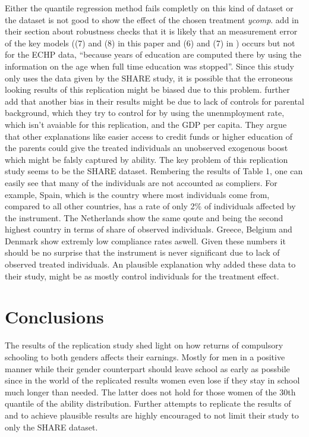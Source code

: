 \documentclass[12pt,a4paper]{article}
\begin{document}
Either the quantile regression method fails completly on this kind of
dataset or the dataset is not good to show the effect of the chosen
treatment \textit{ycomp}. \textcite{brunello} add in their section about
robustness checks that it is likely that an measurement error of the key
models ((7) and (8) in this paper and (6) and (7) in
\textcite{brunello}) occurs but not for the ECHP data, \enquote{because
years of education are computed there by using the information on the
age when full time education was stopped}. Since this study only uses
the data given by the SHARE study, it is possible that the erroneous
looking results of this replication might be biased due to this problem.
\textcite{brunello} further add that another bias in their results might
be due to lack of controls for parental background, which they try to
control for by using the unenmployment rate, which isn't avaiable for
this replication, and the GDP per capita. They argue that other
explanations like easier access to credit funds or higher education of
the parents could give the treated individuals an unobserved exogenous
boost which might be falsly captured by ability. The key problem of this
replication study seems to be the SHARE dataset. Rembering the results
of Table 1, one can easily see that many of the individuals are not
accounted as compliers. For example, Spain, which is the country where
most individuals come from, compared to all other countries, has a rate
of only 2\% of individuals affected by the instrument. The Netherlands
show the same qoute and being the second highest country in terms of
share of observed individuals. Greece, Belgium and Denmark show extremly
low compliance rates aswell. Given these numbers it should be no
surprise that the instrument is never significant due to lack of
observed treated individuals. An plausible explanation why
\textcite{brunello} added these data to their study, might be as mostly
control individuals for the treatment effect.

\hypertarget{conclusions}{%
\section{Conclusions}\label{conclusions}}

The results of the replication study shed light on how returns of
compulsory schooling to both genders affects their earnings. Mostly for
men in a positive manner while their gender counterpart should leave
school as early as possbile since in the world of the replicated results
women even lose if they stay in school much longer than needed. The
latter does not hold for those women of the 30th quantile of the ability
distribution. Further attempts to replicate the results of
\textcite{brunello} and to achieve plausible results are highly
encouraged to not limit their study to only the SHARE dataset.

\newpage

\printbibliography
\end{document}
